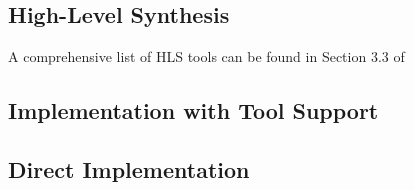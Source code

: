 

\subsection{High-Level Synthesis}

A comprehensive list of HLS tools can be found in Section 3.3 of

\subsection{Implementation with Tool Support}


\subsection{Direct Implementation}

